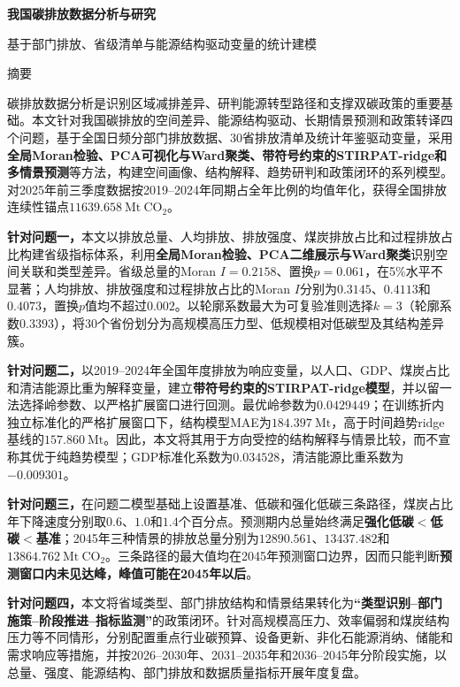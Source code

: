 \documentclass[12pt,a4paper]{ctexart}
\theoremstyle{definition}
\theoremstyle{plain}
\theoremstyle{remark}
\renewenvironment{abstract}
  {\begin{center}\heiti\zihao{-3}摘\quad 要\end{center}\zihao{-4}\songti}
  {\par\vspace{1em}}
\begin{document}
\pagestyle{plain}
\setcounter{page}{1}
\begin{center}
{\heiti\bfseries 我国碳排放数据分析与研究}
\end{center}
\vspace{0.5em}
\begin{center}
基于部门排放、省级清单与能源结构驱动变量的统计建模
\end{center}

\begin{abstract}
\noindent\hspace*{2em}碳排放数据分析是识别区域减排差异、研判能源转型路径和支撑双碳政策的重要基础。本文针对我国碳排放的空间差异、能源结构驱动、长期情景预测和政策转译四个问题，基于全国日频分部门排放数据、30省排放清单及统计年鉴驱动变量，采用\textbf{全局Moran检验、PCA可视化与Ward聚类、带符号约束的STIRPAT-ridge和多情景预测}等方法，构建空间画像、结构解释、趋势研判和政策闭环的系列模型。对2025年前三季度数据按2019--2024年同期占全年比例的均值年化，获得全国排放连续性锚点$11639.658\ \mathrm{Mt\ CO_2}$。

\textbf{针对问题一，}本文以排放总量、人均排放、排放强度、煤炭排放占比和过程排放占比构建省级指标体系，利用\textbf{全局Moran检验、PCA二维展示与Ward聚类}识别空间关联和类型差异。省级总量的Moran $I=0.2158$、置换$p=0.061$，在5\%水平不显著；人均排放、排放强度和过程排放占比的Moran $I$分别为$0.3145$、$0.4113$和$0.4073$，置换$p$值均不超过$0.002$。以轮廓系数最大为可复验准则选择$k=3$（轮廓系数$0.3393$），将30个省份划分为高规模高压力型、低规模相对低碳型及其结构差异簇。

\textbf{针对问题二，}以2019--2024年全国年度排放为响应变量，以人口、GDP、煤炭占比和清洁能源比重为解释变量，建立\textbf{带符号约束的STIRPAT-ridge模型}，并以留一法选择岭参数、以严格扩展窗口进行回测。最优岭参数为$0.0429449$；在训练折内独立标准化的严格扩展窗口下，结构模型MAE为$184.397\ \mathrm{Mt}$，高于时间趋势ridge基线的$157.860\ \mathrm{Mt}$。因此，本文将其用于方向受控的结构解释与情景比较，而不宣称其优于纯趋势模型；GDP标准化系数为$0.034528$，清洁能源比重系数为$-0.009301$。

\textbf{针对问题三，}在问题二模型基础上设置基准、低碳和强化低碳三条路径，煤炭占比年下降速度分别取$0.6$、$1.0$和$1.4$个百分点。预测期内总量始终满足\textbf{强化低碳$<$低碳$<$基准}；2045年三种情景的排放总量分别为$12890.561$、$13437.482$和$13864.762\ \mathrm{Mt\ CO_2}$。三条路径的最大值均在2045年预测窗口边界，因而只能判断\textbf{预测窗口内未见达峰，峰值可能在2045年以后}。

\textbf{针对问题四，}本文将省域类型、部门排放结构和情景结果转化为\textbf{“类型识别--部门施策--阶段推进--指标监测”}的政策闭环。针对高规模高压力、效率偏弱和煤炭结构压力等不同情形，分别配置重点行业碳预算、设备更新、非化石能源消纳、储能和需求响应等措施，并按2026--2030年、2031--2035年和2036--2045年分阶段实施，以总量、强度、能源结构、部门排放和数据质量指标开展年度复盘。
\end{abstract}
\end{document}
